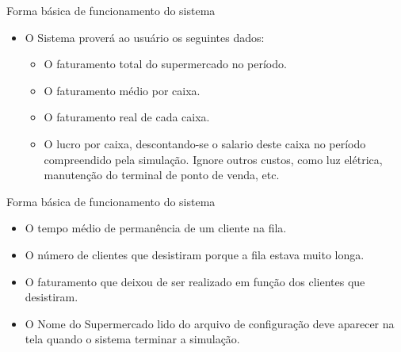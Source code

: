 \documentclass[12pt,table,xcolor={dvipsnames}]{beamer}
\begin{document}
 \begin{frame}[fragile]{Forma básica de funcionamento do sistema}
\begin{itemize}
\item O Sistema proverá ao usuário os seguintes dados:
\begin{itemize}
\item O faturamento total do supermercado no período.
\item O faturamento médio por caixa.
\item O faturamento real de cada caixa.
\item O lucro por caixa, descontando-se o salario deste caixa no período compreendido pela simulação. Ignore outros custos, como luz elétrica, manutenção do terminal de ponto de venda, etc.
\end{itemize}
\end{itemize}
\end{frame}


 \begin{frame}[fragile]{Forma básica de funcionamento do sistema}
\begin{itemize}
\item O tempo médio de permanência de um cliente na fila.
\item O número de clientes que desistiram porque a fila estava muito longa.
\item O faturamento que deixou de ser realizado em função dos clientes que desistiram.
\item O Nome do Supermercado lido do arquivo de configuração deve aparecer na tela quando o sistema terminar a simulação.
\end{itemize}
\end{frame}
\end{document}
